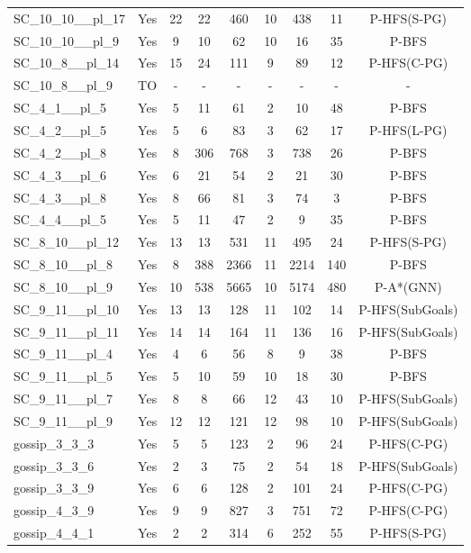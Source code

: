 \documentclass{article}
\begin{document}
\begin{tabular}{lcccccccc}
SC\_10\_10\_\_pl\_17 & Yes & 22 & 22 & 460 & 10 & 438 & 11 & P-HFS(S-PG) \\
SC\_10\_10\_\_pl\_9 & Yes & 9 & 10 & 62 & 10 & 16 & 35 & P-BFS \\
SC\_10\_8\_\_pl\_14 & Yes & 15 & 24 & 111 & 9 & 89 & 12 & P-HFS(C-PG) \\
SC\_10\_8\_\_pl\_9 & TO & - & - & - & - & - & - & - \\
SC\_4\_1\_\_pl\_5 & Yes & 5 & 11 & 61 & 2 & 10 & 48 & P-BFS \\
SC\_4\_2\_\_pl\_5 & Yes & 5 & 6 & 83 & 3 & 62 & 17 & P-HFS(L-PG) \\
SC\_4\_2\_\_pl\_8 & Yes & 8 & 306 & 768 & 3 & 738 & 26 & P-BFS \\
SC\_4\_3\_\_pl\_6 & Yes & 6 & 21 & 54 & 2 & 21 & 30 & P-BFS \\
SC\_4\_3\_\_pl\_8 & Yes & 8 & 66 & 81 & 3 & 74 & 3 & P-BFS \\
SC\_4\_4\_\_pl\_5 & Yes & 5 & 11 & 47 & 2 & 9 & 35 & P-BFS \\
SC\_8\_10\_\_pl\_12 & Yes & 13 & 13 & 531 & 11 & 495 & 24 & P-HFS(S-PG) \\
SC\_8\_10\_\_pl\_8 & Yes & 8 & 388 & 2366 & 11 & 2214 & 140 & P-BFS \\
SC\_8\_10\_\_pl\_9 & Yes & 10 & 538 & 5665 & 10 & 5174 & 480 & P-A*(GNN) \\
SC\_9\_11\_\_pl\_10 & Yes & 13 & 13 & 128 & 11 & 102 & 14 & P-HFS(SubGoals) \\
SC\_9\_11\_\_pl\_11 & Yes & 14 & 14 & 164 & 11 & 136 & 16 & P-HFS(SubGoals) \\
SC\_9\_11\_\_pl\_4 & Yes & 4 & 6 & 56 & 8 & 9 & 38 & P-BFS \\
SC\_9\_11\_\_pl\_5 & Yes & 5 & 10 & 59 & 10 & 18 & 30 & P-BFS \\
SC\_9\_11\_\_pl\_7 & Yes & 8 & 8 & 66 & 12 & 43 & 10 & P-HFS(SubGoals) \\
SC\_9\_11\_\_pl\_9 & Yes & 12 & 12 & 121 & 12 & 98 & 10 & P-HFS(SubGoals) \\
gossip\_3\_3\_3 & Yes & 5 & 5 & 123 & 2 & 96 & 24 & P-HFS(C-PG) \\
gossip\_3\_3\_6 & Yes & 2 & 3 & 75 & 2 & 54 & 18 & P-HFS(SubGoals) \\
gossip\_3\_3\_9 & Yes & 6 & 6 & 128 & 2 & 101 & 24 & P-HFS(C-PG) \\
gossip\_4\_3\_9 & Yes & 9 & 9 & 827 & 3 & 751 & 72 & P-HFS(C-PG) \\
gossip\_4\_4\_1 & Yes & 2 & 2 & 314 & 6 & 252 & 55 & P-HFS(S-PG) \\

\end{tabular}
\end{document}
